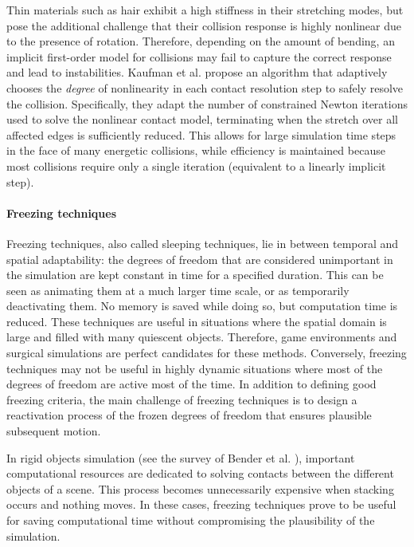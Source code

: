 Thin materials such as hair exhibit a high stiffness in their stretching modes, but pose the additional challenge that their collision response is highly nonlinear due to the presence of rotation.
Therefore, depending on the amount of bending, an implicit first-order model for collisions may fail to capture the correct response and lead to instabilities.
Kaufman et al. \cite{Kaufman2014} propose an algorithm that adaptively chooses the \emph{degree} of nonlinearity in each contact resolution step to safely resolve the collision.
Specifically, they adapt the number of constrained Newton iterations used to solve the nonlinear contact model, terminating when the stretch over all affected edges is sufficiently reduced.
This allows for large simulation time steps in the face of many energetic collisions, while efficiency is maintained because most collisions require only a single iteration (equivalent to a linearly implicit step).

\paragraph*{Freezing techniques}

Freezing techniques, also called sleeping techniques, lie in between temporal and spatial adaptability: the degrees of freedom that are considered unimportant in the simulation are kept constant in time for a specified duration.
This can be seen as animating them at a much larger time scale, or as temporarily deactivating them.
No memory is saved while doing so, but computation time is reduced.
These techniques are useful in situations where the spatial domain is large and filled with many quiescent objects.
Therefore, game environments and surgical simulations are perfect candidates for these methods.
Conversely, freezing techniques may not be useful in highly dynamic situations where most of the degrees of freedom are active most of the time.
In addition to defining good freezing criteria, the main challenge of freezing techniques is to design a reactivation process of the frozen degrees of freedom that ensures plausible subsequent motion.

In rigid objects simulation (see the survey of Bender et al. \cite{Bender2012:rigid}), important computational resources are dedicated to solving contacts between the different objects of a scene.
This process becomes unnecessarily expensive when stacking occurs and nothing moves.
In these cases, freezing techniques prove to be useful for saving computational time without compromising the plausibility of the simulation.

